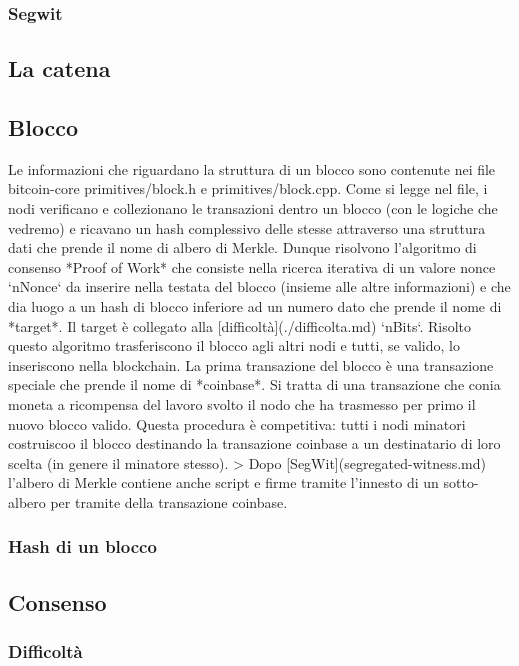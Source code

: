 \documentclass{article}
\begin{document}
\subsubsection{Segwit}

\newpage
\subsection{La catena}

\newpage
\subsection{Blocco}
Le informazioni che riguardano la struttura di un blocco sono contenute nei file bitcoin-core primitives/block.h e primitives/block.cpp.
Come si legge nel file, i nodi verificano e collezionano le transazioni dentro un blocco (con le logiche che vedremo) e ricavano un hash complessivo delle stesse attraverso una struttura dati che prende il nome di albero di Merkle.
Dunque risolvono l'algoritmo di consenso *Proof of Work* che consiste nella ricerca iterativa di un valore nonce `nNonce` da inserire nella testata del blocco (insieme alle altre informazioni) e che dia luogo a un hash di blocco inferiore ad un numero dato che prende il nome di *target*. Il target è collegato alla [difficoltà](./difficolta.md) `nBits`.
Risolto questo algoritmo trasferiscono il blocco agli altri nodi e tutti, se valido, lo inseriscono nella blockchain. La prima transazione del blocco è una transazione speciale che prende il nome di *coinbase*. Si tratta di una transazione che conia moneta a ricompensa del lavoro svolto il nodo che ha trasmesso per primo il nuovo blocco valido. Questa procedura è competitiva: tutti i nodi minatori costruiscoo il blocco destinando la transazione coinbase a un destinatario di loro scelta (in genere il minatore stesso).
> Dopo [SegWit](segregated-witness.md) l'albero di Merkle contiene anche script e firme tramite l'innesto di un sotto-albero per tramite della transazione coinbase.

\subsubsection{Hash di un blocco}

\newpage
\subsection{Consenso}
\subsubsection{Difficoltà}
\end{document}
